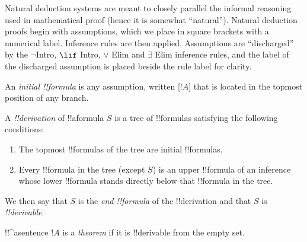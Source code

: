 \documentclass[../../include/open-logic-section]{subfiles}
\begin{document}
\begin{explain}
Natural deduction systems are meant to closely parallel the informal
reasoning used in mathematical proof (hence it is somewhat 
``natural''). Natural deduction proofs begin with assumptions, which 
we place in square brackets with a numerical label. Inference rules are then
applied. Assumptions are ``discharged'' by the $\lnot$Intro, $\lif$ 
Intro, $\lor$ Elim and $\exists$ Elim inference rules, and the 
label of the discharged assumption is placed beside the rule label for
clarity.
\end{explain}

\begin{defn}
An \emph{initial !!{formula}} is any assumption, written [$!A$] that
is located in the topmost position of any branch.
\end{defn}

\begin{defn}[!!^{derivation}]
A \emph{!!{derivation}} of !!a{formula} $S$ is a tree of !!{formula}s
satisfying the following conditions:
\begin{enumerate}
\item The topmost !!{formula}s of the tree are initial !!{formula}s.
\item Every !!{formula} in the tree (except $S$) is an upper !!{formula} of an
  inference whose lower !!{formula} stands directly below that !!{formula} in
  the tree.
\end{enumerate}
We then say that $S$ is the \emph{end-!!{formula}} of the !!{derivation} and
that $S$ is \emph{!!{derivable}}.
\end{defn}

\begin{defn}[Theorem]
!!^a{sentence} $!A$ is a \emph{theorem} if it is !!{derivable}
from the empty set.
\end{defn}
\end{document}
